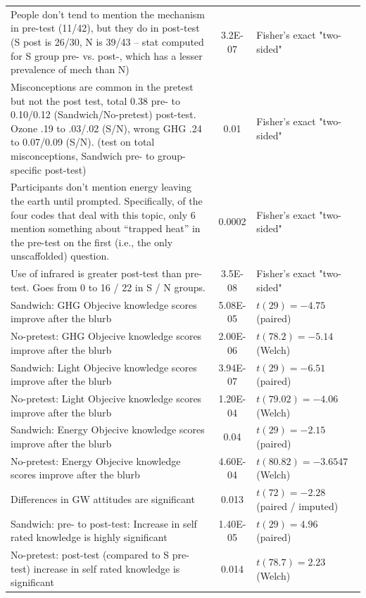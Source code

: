 \begin{longtabu}{X[2.5]S[table-parse-only]X[l]}
People don't tend to mention the mechanism in pre-test (11/42), but they do in
post-test (S post is 26/30, N is 39/43 -- stat computed for S group pre- vs.
post-, which has a lesser prevalence of mech than N)	&	3.2E-07	&
Fisher's exact "two-sided"	\\
Misconceptions are common in the pretest but not the post test, total 0.38 pre-
to 0.10/0.12 (Sandwich/No-pretest) post-test. Ozone .19 to .03/.02 (S/N),  wrong
GHG  .24 to 0.07/0.09 (S/N). (test on total misconceptions, Sandwich pre- to
group-specific post-test)	&	0.01	&	Fisher's exact "two-sided"	\\
Participants don't mention energy leaving the earth until prompted.
Specifically, of the four codes that deal with this topic, only 6 mention
something about “trapped heat” in the pre-test on the first (i.e., the only
unscaffolded) question.	&	0.0002	&	Fisher's exact "two-sided"	\\
Use of infrared is greater post-test than pre-test. Goes from 0 to 16 / 22 in S
/ N groups.	&	3.5E-08	&	Fisher's exact "two-sided"	\\
Sandwich: GHG Objecive knowledge scores improve after the blurb	&	5.08E-05
&	$t(29) = -4.75$ (paired)	\\
No-pretest: GHG Objecive knowledge scores improve after the blurb	&	2.00E-06
&	$t(78.2) = -5.14$ (Welch)	\\
Sandwich: Light Objecive knowledge scores improve after the blurb	&	3.94E-07
&	$t(29) = -6.51$ (paired)	\\
No-pretest: Light Objecive knowledge scores improve after the blurb	&	1.20E-04
&	$t(79.02) = -4.06$ (Welch)	\\
Sandwich: Energy Objecive knowledge scores improve after the blurb	&	0.04
&	$t(29) = -2.15$ (paired)	\\
No-pretest: Energy Objecive knowledge scores improve after the blurb	&
4.60E-04	&	$t(80.82) = -3.6547$ (Welch)	\\
Differences in GW attitudes are significant	&	0.013	&	$t(72) = -2.28$
(paired / imputed)	\\
Sandwich: pre- to post-test: Increase in self rated knowledge is highly
significant	&	1.40E-05	&	$t(29) = 4.96$ (paired)	\\
No-pretest: post-test (compared to S pre-test) increase in self rated knowledge
is significant	&	0.014	&	$t(78.7) = 2.23$ (Welch)	\\
					
\end{longtabu}


